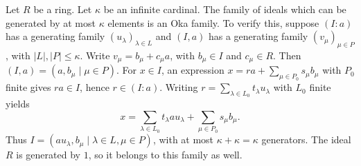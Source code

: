 \begin{example}
\label{example-oka-family-bound-cardinality}
Let $R$ be a ring.
Let $\kappa$ be an infinite cardinal.
The family of ideals which can be generated by at most $\kappa$ elements
is an Oka family. To verify this, suppose $(I:a)$ has a
generating family $(u_\lambda)_{\lambda\in L}$ and $(I,a)$ has
a generating family $(v_\mu)_{\mu\in P}$, with $|L|,|P|\leq\kappa$.
Write $v_\mu=b_\mu+c_\mu a$, with $b_\mu\in I$ and $c_\mu\in R$.
Then $(I,a)=(a,b_\mu\mid\mu\in P)$.
For $x\in I$, an expression
$x=ra+\sum_{\mu\in P_0}s_\mu b_\mu$ with $P_0$ finite gives
$ra\in I$, hence $r\in(I:a)$. Writing
$r=\sum_{\lambda\in L_0}t_\lambda u_\lambda$ with $L_0$ finite yields
$$
x=\sum_{\lambda\in L_0}t_\lambda a u_\lambda+
\sum_{\mu\in P_0}s_\mu b_\mu.
$$
Thus $I=(a u_\lambda,b_\mu\mid\lambda\in L,\mu\in P)$, with
at most $\kappa+\kappa=\kappa$ generators. The ideal $R$ is
generated by $1$, so it belongs to this family as well.
\end{example}